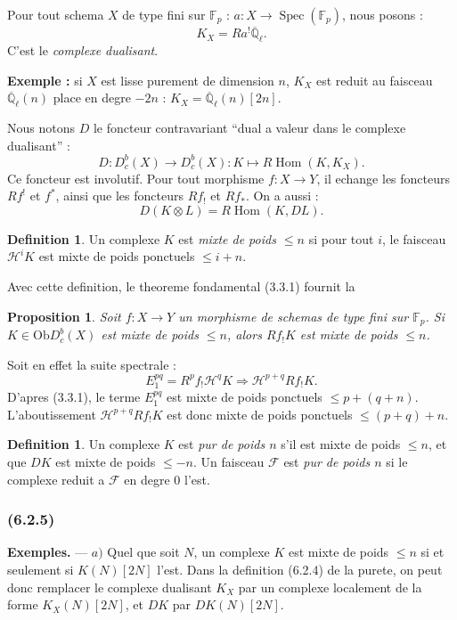 \documentclass[12pt,a4paper]{article}
\theoremstyle{plain}
\newtheorem{proposition}[theorem]{Proposition}
\theoremstyle{definition}
\newtheorem{definition}[theorem]{Definition}
\theoremstyle{remark}
\newcommand{\Ob}{\mathrm{Ob}}
\DeclareMathOperator{\Hom}{Hom}
\DeclareMathOperator{\Spec}{Spec}
\newcommand{\scrF}{\mathscr{F}}
\newcommand{\scrH}{\mathscr{H}}
\newcommand{\Qlb}{\overline{\mathbb{Q}}_\ell}
\newcommand{\Fp}{\mathbb{F}_p}
\begin{document}
Pour tout schema $X$ de type fini sur $\Fp$ : $a : X \to \Spec(\Fp)$, nous posons :
\[
K_X = Ra^! \Qlb.
\]
C'est le \emph{complexe dualisant}.

\textbf{Exemple :} si $X$ est lisse purement de dimension $n$, $K_X$ est reduit au faisceau $\Qlb(n)$ place en degre $-2n$ : $K_X = \Qlb(n)[2n]$.

Nous notons $D$ le foncteur contravariant ``dual a valeur dans le complexe dualisant'' :
\[
D : D_c^b(X) \to D_c^b(X) : K \mapsto R\Hom(K, K_X).
\]
Ce foncteur est involutif. Pour tout morphisme $f : X \to Y$, il echange les foncteurs $Rf^!$ et $f^*$, ainsi que les foncteurs $Rf_!$ et $Rf_*$. On a aussi :
\[
D(K \otimes L) = R\Hom(K, DL).
\]

\begin{definition}
Un complexe $K$ est \emph{mixte de poids $\leq n$} si pour tout $i$, le faisceau $\scrH^i K$ est mixte de poids ponctuels $\leq i + n$.
\end{definition}

Avec cette definition, le theoreme fondamental (3.3.1) fournit la

\begin{proposition}
Soit $f : X \to Y$ un morphisme de schemas de type fini sur $\Fp$. Si $K \in \Ob D_c^b(X)$ est mixte de poids $\leq n$, alors $Rf_! K$ est mixte de poids $\leq n$.
\end{proposition}

Soit en effet la suite spectrale :
\[
E_1^{pq} = R^p f_! \scrH^q K \Rightarrow \scrH^{p+q} Rf_! K.
\]
D'apres (3.3.1), le terme $E_1^{pq}$ est mixte de poids ponctuels $\leq p + (q + n)$. L'aboutissement $\scrH^{p+q} Rf_! K$ est donc mixte de poids ponctuels $\leq (p+q) + n$.

\begin{definition}
Un complexe $K$ est \emph{pur de poids $n$} s'il est mixte de poids $\leq n$, et que $DK$ est mixte de poids $\leq -n$. Un faisceau $\scrF$ est \emph{pur de poids $n$} si le complexe reduit a $\scrF$ en degre $0$ l'est.
\end{definition}

\subsubsection*{\textup{(6.2.5)}}

\textbf{Exemples.} --- $a)$ Quel que soit $N$, un complexe $K$ est mixte de poids $\leq n$ si et seulement si $K(N)[2N]$ l'est. Dans la definition (6.2.4) de la purete, on peut donc remplacer le complexe dualisant $K_X$ par un complexe localement de la forme $K_X(N)[2N]$, et $DK$ par $DK(N)[2N]$.
\end{document}

